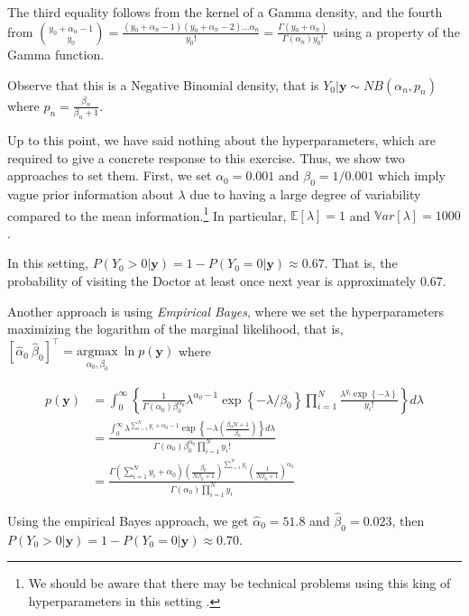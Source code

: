 The third equality follows from the kernel of a Gamma density, and the fourth from ${y_0+\alpha_n-1 \choose y_0}=\frac{(y_0+\alpha_n-1)(y_0+\alpha_n-2)\dots\alpha_n}{y_0!}=\frac{\Gamma(y_0+\alpha_n)}{\Gamma(\alpha_n)y_0!}$ using a property of the Gamma function.

Observe that this is a Negative Binomial density, that is $Y_0|\mathbf{y}\sim NB(\alpha_n,p_n)$ where $p_n=\frac{\beta_n}{\beta_n+1}$. 

Up to this point, we have said nothing about the hyperparameters, which are required to give a concrete response to this exercise. Thus, we show two approaches to set them. First, we set $\alpha_0=0.001$ and $\beta_0=1/0.001$ which imply vague prior information about $\lambda$ due to having a large degree of variability compared to the mean information.\footnote{We should be aware that there may be technical problems using this king of hyperparameters in this setting \cite{gelman2006prior}.} In particular, $\mathbb{E}[\lambda]=1$ and $\mathbb{V}ar[\lambda]=1000$. 

In this setting, $P(Y_0>0|\mathbf{y})=1-P(Y_0=0|\mathbf{y})\approx 0.67$. That is, the probability of visiting the Doctor at least once next year is approximately 0.67.

Another approach is using \textit{Empirical Bayes}, where we set the hyperparameters maximizing the logarithm of the marginal likelihood, that is, $\left[\hat{\alpha}_0 \ \hat{\beta}_0\right]^{\top}=\underset{\alpha_0 ,\beta_0}{\mathrm{argmax}} \ \ln p(\mathbf{y})$ where

\begin{align*}
	p(\mathbf{y})&=\int_0^{\infty}\left\{\frac{1}{\Gamma(\alpha_0)\beta_0^{\alpha_0}}\lambda^{\alpha_0-1}\exp\left\{-\lambda/\beta_0\right\} \prod_{i=1}^N\frac{\lambda^{y_i}\exp\left\{-\lambda\right\}}{ y_i!}\right\}d\lambda\\
	&=\frac{\int_0^{\infty}\lambda^{\sum_{i=1}^N y_i+\alpha_0-1}\exp\left\{-\lambda \left(\frac{\beta_0 N +1}{\beta_0}\right) \right\}d\lambda}{\Gamma(\alpha_0)\beta_0^{\alpha_0}\prod_{i=1}^N y_i!}\\
	&=\frac{\Gamma(\sum_{i=1}^N y_i+\alpha_0)\left(\frac{\beta_0}{N\beta_0+1}\right)^{\sum_{i=1}^N y_i}\left(\frac{1}{N\beta_0+1}\right)^{\alpha_0}}{\Gamma(\alpha_0)\prod_{i=1}^N y_i}
\end{align*}

Using the empirical Bayes approach, we get $\hat{\alpha}_0=51.8$ and $\hat{\beta}_0=0.023$, then $P(Y_0>0|\mathbf{y})=1-P(Y_0=0|\mathbf{y})\approx 0.70$.

